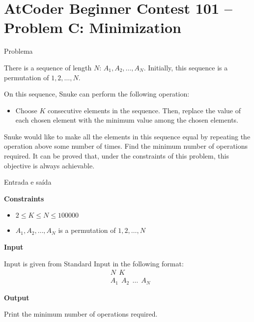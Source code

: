 \section{AtCoder Beginner Contest 101 -- Problem C: Minimization}

\begin{frame}[fragile]{Problema}

There is a sequence of length $N$: $A_1, A_2, \ldots, A_N$.  Initially, this sequence is a 
permutation of $1, 2, \ldots, N$.

On this sequence, Snuke can perform the following operation:

\begin{itemize}
    \item Choose $K$ consecutive elements in the sequence. Then, replace the value of each chosen element with the minimum value among the chosen elements.
\end{itemize}

Snuke would like to make all the elements in this sequence equal by repeating the operation above some number of times. Find the minimum number of operations required. It can be proved that, under the constraints of this problem, this objective is always achievable.

\end{frame}

\begin{frame}[fragile]{Entrada e saída}

\textbf{Constraints}

\begin{itemize}
    \item $2\leq K\leq N\leq 100000$
    \item $A_1, A_2, \ldots, A_N$ is a permutation of $1, 2, \ldots, N$
\end{itemize}

\textbf{Input}

Input is given from Standard Input in the following format:
\begin{align*}
&N\ \ K \\
&A_1\ \ A_2\ \ \ldots\ \ A_N
\end{align*}

\textbf{Output}

Print the minimum number of operations required.

\end{frame}

